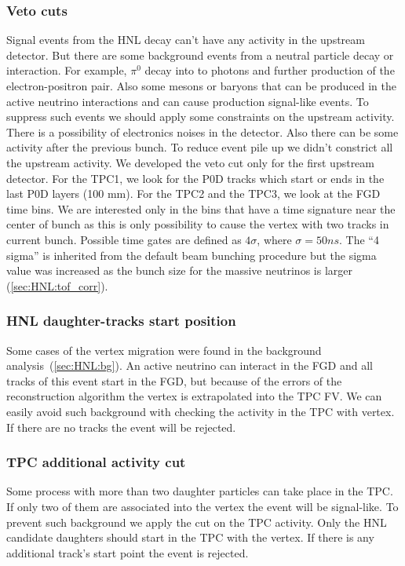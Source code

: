\documentclass[../main.tex]{subfiles}
\begin{document}
\subsubsection{Veto cuts}
Signal events from the HNL decay can't have any activity in the upstream detector. But there are some background events from a neutral particle decay or interaction. For example, $\pi^0$ decay into to photons and further production of the electron-positron pair. Also some mesons or baryons that can be produced in the active neutrino interactions and can cause production signal-like events. To suppress such events we should apply some constraints on the upstream activity. There is a possibility of electronics noises in the detector. Also there can be some activity after the previous bunch. To reduce event pile up we didn't constrict all the upstream activity. We developed the veto cut only for the first upstream detector. For the TPC1, we look for the P0D tracks which start or ends in the last P0D layers (100 mm). For the TPC2 and the  TPC3, we look at the FGD time bins. We are interested only in the bins that have a time signature near the center of bunch as this is only possibility to cause the vertex with two tracks in current bunch. Possible time gates are defined as $4\sigma$, where $\sigma=50ns$. The ``4 sigma'' is inherited from the default beam bunching procedure but the sigma value was increased as the bunch size for the massive neutrinos is larger (\autoref{sec:HNL:tof_corr}).

\subsubsection{HNL daughter-tracks start position}
Some cases of the vertex migration were found in the background analysis~(\autoref{sec:HNL:bg}). An active neutrino can interact in the FGD and all tracks of this event start in the FGD, but because of the errors of the reconstruction algorithm the vertex is extrapolated into the TPC FV. We can easily avoid such background with checking the activity in the TPC with vertex. If there are no tracks the event will be rejected.

\subsubsection{TPC additional activity cut}
Some process with more than two daughter particles can take place in the TPC. If only two of them are associated into the vertex the event will be signal-like. To prevent such background we apply the cut on the TPC activity. Only the HNL candidate daughters should start in the TPC with the vertex. If there is any additional track's start point the event is rejected.
\end{document}
